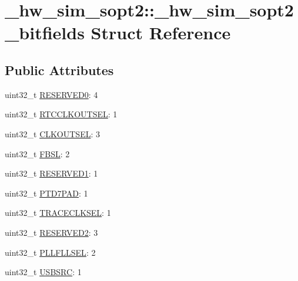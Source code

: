 \hypertarget{struct__hw__sim__sopt2_1_1__hw__sim__sopt2__bitfields}{}\section{\+\_\+hw\+\_\+sim\+\_\+sopt2\+:\+:\+\_\+hw\+\_\+sim\+\_\+sopt2\+\_\+bitfields Struct Reference}
\label{struct__hw__sim__sopt2_1_1__hw__sim__sopt2__bitfields}
\subsection*{Public Attributes}
\begin{DoxyCompactItemize}
\item 
uint32\+\_\+t \hyperlink{struct__hw__sim__sopt2_1_1__hw__sim__sopt2__bitfields_a80c2ea2e6b519f46eb9f16aab0bffe28}{R\+E\+S\+E\+R\+V\+E\+D0}\+: 4
\item 
uint32\+\_\+t \hyperlink{struct__hw__sim__sopt2_1_1__hw__sim__sopt2__bitfields_ac5a0a8a06c27c2a9a8d6eec3e8bdef0c}{R\+T\+C\+C\+L\+K\+O\+U\+T\+S\+EL}\+: 1
\item 
uint32\+\_\+t \hyperlink{struct__hw__sim__sopt2_1_1__hw__sim__sopt2__bitfields_a03a4f84d124df213c9aee2957192db60}{C\+L\+K\+O\+U\+T\+S\+EL}\+: 3
\item 
uint32\+\_\+t \hyperlink{struct__hw__sim__sopt2_1_1__hw__sim__sopt2__bitfields_a2ee5f2c67b755bf7d4a90e7d1ccc0b6a}{F\+B\+SL}\+: 2
\item 
uint32\+\_\+t \hyperlink{struct__hw__sim__sopt2_1_1__hw__sim__sopt2__bitfields_a70050ae1ebd5ba23dbb4bc76428cc170}{R\+E\+S\+E\+R\+V\+E\+D1}\+: 1
\item 
uint32\+\_\+t \hyperlink{struct__hw__sim__sopt2_1_1__hw__sim__sopt2__bitfields_a17446a7d9de5fbf6db44c97a11247018}{P\+T\+D7\+P\+AD}\+: 1
\item 
uint32\+\_\+t \hyperlink{struct__hw__sim__sopt2_1_1__hw__sim__sopt2__bitfields_afcebf172c8cd967b4d0d3f3e06ca1d93}{T\+R\+A\+C\+E\+C\+L\+K\+S\+EL}\+: 1
\item 
uint32\+\_\+t \hyperlink{struct__hw__sim__sopt2_1_1__hw__sim__sopt2__bitfields_a0d19c0f2d673b9c2189c9c4890fad39a}{R\+E\+S\+E\+R\+V\+E\+D2}\+: 3
\item 
uint32\+\_\+t \hyperlink{struct__hw__sim__sopt2_1_1__hw__sim__sopt2__bitfields_a401c03bae34adeb673a9b1015f2207e7}{P\+L\+L\+F\+L\+L\+S\+EL}\+: 2
\item 
uint32\+\_\+t \hyperlink{struct__hw__sim__sopt2_1_1__hw__sim__sopt2__bitfields_ac70a3aa02a74b70417dcbd3eb04f002f}{U\+S\+B\+S\+RC}\+: 1

\end{DoxyCompactItemize}
